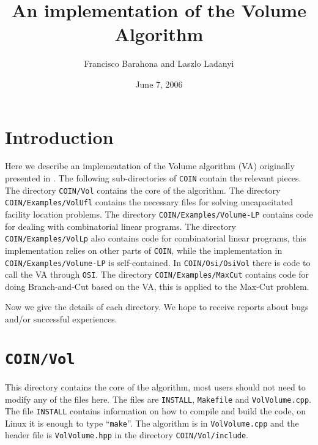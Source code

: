 \documentclass{article}
\begin{document}


\title{\bf An implementation of the Volume Algorithm}
\author{Francisco Barahona and Laszlo Ladanyi}
\date{June 7, 2006}
\maketitle

\section{Introduction}

Here we describe an implementation of the Volume algorithm (VA) originally
presented in \cite{BA1}. The following sub-directories of
{\tt COIN} contain the relevant pieces. The directory {\tt COIN/Vol}
contains the core of the algorithm. The directory {\tt COIN/Examples/VolUfl}
contains the necessary files for solving uncapacitated facility location
problems. The directory {\tt COIN/Examples/Volume-LP} contains code for
dealing with combinatorial linear programs. The directory 
{\tt COIN/Examples/VolLp} also contains code for combinatorial linear
programs, this implementation relies on other parts of {\tt COIN}, while
the implementation in {\tt COIN/Examples/Volume-LP} is self-contained. 
In {\tt COIN/Osi/OsiVol} there is code to call the VA through {\tt OSI}.
The directory {\tt COIN/Examples/MaxCut}
contains code for doing Branch-and-Cut based on the VA, this is
applied to the Max-Cut problem. 

Now we give the details of each directory. We hope to receive reports about bugs and/or
successful experiences. 


\section{{\tt COIN/Vol}}
This directory contains the core of the algorithm, most users should not need
to modify any of the files here. The files are {\tt INSTALL}, {\tt Makefile}
and {\tt VolVolume.cpp}. The file {\tt INSTALL} contains information on how
to compile and build the code, on Linux it is enough to type ``{\tt make}''.
The algorithm is in {\tt VolVolume.cpp} and the header file is 
{\tt VolVolume.hpp} in the directory {\tt COIN/Vol/include}.
\end{document}
